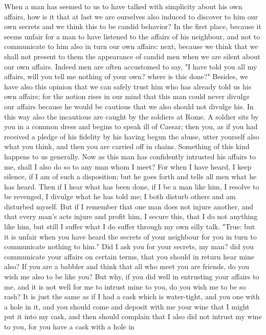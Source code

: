 \documentclass[a4paper]{article}
\begin{document}
    When a man has seemed to us to have talked with simplicity about his own
affairs, how is it that at last we are ourselves also induced to discover to
him our own secrets and we think this to be candid behavior? In the first
place, because it seems unfair for a man to have listened to the affairs of his
neighbour, and not to communicate to him also in turn our own affairs: next,
because we think that we shall not present to them the appearance of candid men
when we are silent about our own affairs. Indeed men are often accustomed to
say, "I have told you all my affairs, will you tell me nothing of your own?
where is this done?" Besides, we have also this opinion that we can safely
trust him who has already told us his own affairs; for the notion rises in our
mind that this man could never divulge our affairs because he would be cautious
that we also should not divulge his. In this way also the incautious are caught
by the soldiers at Rome. A soldier sits by you in a common dress and begins to
speak ill of Caesar; then you, as if you had received a pledge of his fidelity
by his having begun the abuse, utter yourself also what you think, and then you
are carried off in chains.
    Something of this kind happens to us generally. Now as this man has
confidently intrusted his affairs to me, shall I also do so to any man whom I
meet? For when I have heard, I keep silence, if I am of such a disposition; but
he goes forth and tells all men what he has heard. Then if I hear what has been
done, if I be a man like him, I resolve to be revenged, I divulge what he has
told me; I both disturb others and am disturbed myself. But if I remember that
one man does not injure another, and that every man's acts injure and profit
him, I secure this, that I do not anything like him, but still I suffer what I
do suffer through my own silly talk.
    "True: but it is unfair when you have heard the secrets of your neighbour
for you in turn to communicate nothing to him." Did I ask you for your secrets,
my man? did you communicate your affairs on certain terms, that you should in
return hear mine also? If you are a babbler and think that all who meet you are
friends, do you wish me also to be like you? But why, if you did well in
entrusting your affairs to me, and it is not well for me to intrust mine to
you, do you wish me to be so rash? It is just the same as if I had a cask which
is water-tight, and you one with a hole in it, and you should come and deposit
with me your wine that I might put it into my cask, and then should complain
that I also did not intrust my wine to you, for you have a cask with a hole in
\end{document}

